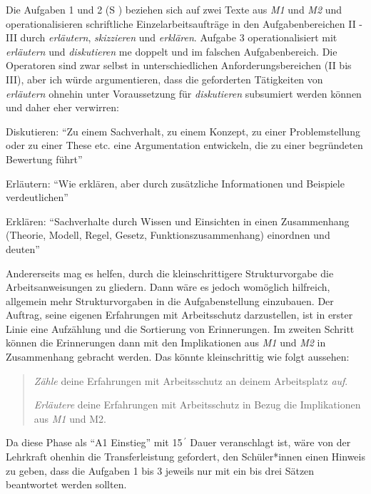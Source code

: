 Die Aufgaben 1 und 2 (\gls{S} \pageref{DEMOKRATIE-A1}) beziehen sich auf zwei Texte aus \emph{M1} und \emph{M2} und operationalisieren schriftliche Einzelarbeitsaufträge in den Aufgabenbereichen II - III durch \emph{erläutern}, \emph{skizzieren} und \emph{erklären}.
Aufgabe 3 operationalisiert mit \emph{erläutern} und \emph{diskutieren} \gls{me} doppelt und im falschen Aufgabenbereich. Die Operatoren sind zwar selbst in unterschiedlichen Anforderungsbereichen (II bis III), aber ich würde argumentieren, dass die geforderten Tätigkeiten von \emph{erläutern} ohnehin unter Voraussetzung für \emph{diskutieren} subsumiert werden können und daher eher verwirren:
\begin{myitemize}
    \item Diskutieren: \enquote{Zu einem Sachverhalt, zu einem Konzept, zu einer Problemstellung oder zu einer These etc. eine Argumentation entwickeln, die zu einer begründeten Bewertung führt} 
    \item Erläutern: \enquote{Wie erklären, aber durch zusätzliche Informationen und Beispiele verdeutlichen}
    \item Erklären: \enquote{Sachverhalte durch Wissen und Einsichten in einen Zusammenhang (Theorie, Modell, Regel, Gesetz, Funktionszusammenhang) einordnen und deuten} 

    \autocite[][13-14]{lower2008}
\end{myitemize}
Andererseits mag es helfen, durch die kleinschrittigere Strukturvorgabe die Arbeitsanweisungen zu gliedern. Dann wäre es jedoch womöglich hilfreich, allgemein mehr Strukturvorgaben in die Aufgabenstellung einzubauen. Der Auftrag, seine eigenen Erfahrungen mit Arbeitsschutz darzustellen, ist in erster Linie eine Aufzählung und die Sortierung von Erinnerungen. Im zweiten Schritt können die Erinnerungen dann mit den Implikationen aus \emph{M1} und \emph{M2} in Zusammenhang gebracht werden. 
Das könnte kleinschrittig wie folgt aussehen:
\begin{quote}
    \emph{Zähle} deine Erfahrungen mit Arbeitsschutz an deinem Arbeitsplatz \emph{auf}.

    \emph{Erläutere} deine Erfahrungen mit Arbeitsschutz in Bezug die Implikationen aus \emph{M1} und M2. 
\end{quote}

Da diese Phase als \enquote{A1 Einstieg} mit 15$\,^{\prime}$ Dauer veranschlagt ist, wäre von der Lehrkraft ohenhin die Transferleistung gefordert, den Schüler*innen einen Hinweis zu geben, dass die Aufgaben 1 bis 3 jeweils nur mit ein bis drei Sätzen beantwortet werden sollten.

